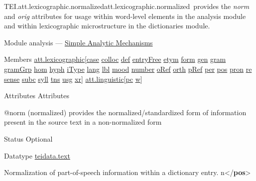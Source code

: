 \begin{reflist}
\item[]\begin{specHead}{TEI.att.lexicographic.normalized}{att.lexicographic.normalized} provides the {\itshape norm} and {\itshape orig} attributes for usage within word-level elements in the analysis module and within lexicographic microstructure in the dictionaries module.\end{specHead} 
    \item[{Module}]
  analysis — \hyperref[AI]{Simple Analytic Mechanisms}
    \item[{Members}]
  \hyperref[TEI.att.lexicographic]{att.lexicographic}[\hyperref[TEI.case]{case} \hyperref[TEI.colloc]{colloc} \hyperref[TEI.def]{def} \hyperref[TEI.entryFree]{entryFree} \hyperref[TEI.etym]{etym} \hyperref[TEI.form]{form} \hyperref[TEI.gen]{gen} \hyperref[TEI.gram]{gram} \hyperref[TEI.gramGrp]{gramGrp} \hyperref[TEI.hom]{hom} \hyperref[TEI.hyph]{hyph} \hyperref[TEI.iType]{iType} \hyperref[TEI.lang]{lang} \hyperref[TEI.lbl]{lbl} \hyperref[TEI.mood]{mood} \hyperref[TEI.number]{number} \hyperref[TEI.oRef]{oRef} \hyperref[TEI.orth]{orth} \hyperref[TEI.pRef]{pRef} \hyperref[TEI.per]{per} \hyperref[TEI.pos]{pos} \hyperref[TEI.pron]{pron} \hyperref[TEI.re]{re} \hyperref[TEI.sense]{sense} \hyperref[TEI.subc]{subc} \hyperref[TEI.syll]{syll} \hyperref[TEI.tns]{tns} \hyperref[TEI.usg]{usg} \hyperref[TEI.xr]{xr}] \hyperref[TEI.att.linguistic]{att.linguistic}[\hyperref[TEI.pc]{pc} \hyperref[TEI.w]{w}]
    \item[{Attributes}]
  Attributes\hfil\\[-10pt]\begin{sansreflist}
    \item[@norm]
  (normalized) provides the normalized/standardized form of information present in the source text in a non-normalized form
\begin{reflist}
    \item[{Status}]
  Optional
    \item[{Datatype}]
  \hyperref[TEI.teidata.text]{teidata.text}
    \item[]Normalization of part-of-speech information within a dictionary entry.\mbox{}\newline 
{}n{</\textbf{pos}>}\mbox{}\newline 

\end{reflist}
\end{sansreflist}
\end{reflist}
